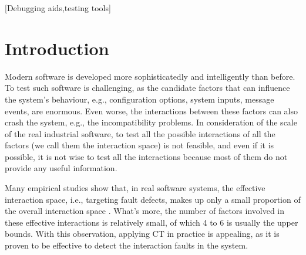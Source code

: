 \documentclass{sig-alternate}
\begin{document}
[Debugging aids,testing tools]



\section{Introduction}

Modern software is developed more sophisticatedly and intelligently than before. To test such software is challenging, as the candidate factors that can influence the system's behaviour, e.g., configuration options, system inputs, message events, are enormous. Even worse, the interactions between these factors can also crash the system, e.g., the incompatibility problems. In consideration of the scale of the real industrial software, to test all the possible interactions of all the factors (we call them the interaction space) is not feasible, and even if it is possible, it is not wise to test all the interactions because most of them do not provide any useful information.

Many empirical studies show that, in real software systems, the effective interaction space, i.e., targeting fault defects, makes up only a small proportion of the overall interaction space \cite{kuhn2002investigation,kuhn2004software}. What's more, the number of factors involved in these effective interactions is relatively small, of which 4 to 6 is usually the upper bounds\cite{kuhn2002investigation}. With this observation, applying CT in practice is appealing, as it is proven to be effective to detect the interaction faults in the system.
\end{document}

